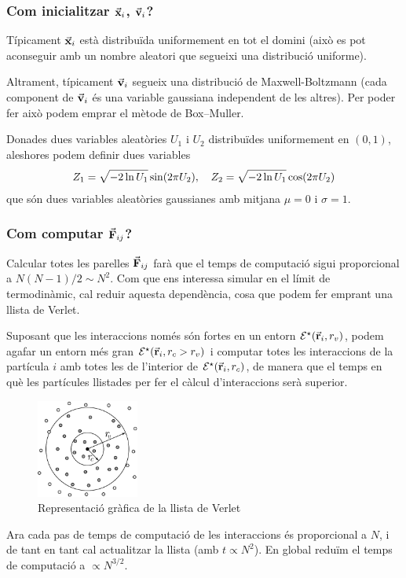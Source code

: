 \subsubsection*{Com inicialitzar $\va{x}_{i}$, $\va{v}_{i}$?}
Típicament $\va{x}_{i}$ està distribuïda uniformement en tot el domini (això es pot aconseguir amb un nombre aleatori que segueixi una distribució uniforme).

Altrament, típicament $\va{v}_{i}$ segueix una distribució de Maxwell-Boltzmann (cada component de $\va{v}_{i}$ és una variable gaussiana independent de les altres). Per poder fer això podem emprar el mètode de Box--Muller.

\begin{meth}\label{met:box-muller}
	Donades dues variables aleatòries $U_{1}$ i $U_{2}$ distribuïdes uniformement en $(0,1)$, aleshores podem definir dues variables
	\begin{align}
		Z_{1} = \sqrt{-2 \ln U_{1}} \sin (2\pi U_{2}) \qc Z_{2} = \sqrt{-2 \ln U_{1}} \cos (2\pi U_{2})
	\end{align}
	que són dues variables aleatòries gaussianes amb mitjana $\mu = 0$ i $\sigma = 1$.
\end{meth}

\subsubsection*{Com computar $\va{F}_{ij}$?}
Calcular totes les parelles $\va{F}_{ij}$ farà que el temps de computació sigui proporcional a $N (N-1)/2 \sim N^{2}$. Com que ens interessa simular en el límit de termodinàmic, cal reduir aquesta dependència, cosa que podem fer emprant una llista de Verlet.
\begin{meth}\label{meth:llista-verlet}
	Suposant que les interaccions només són fortes en un entorn $\mathcal{E}^{\star}{}(\va{r}_{i},r_{v})$, podem agafar un entorn més gran $\mathcal{E}^{\star}{}(\va{r}_{i},r_{c} > r_{v})$ i computar totes les interaccions de la partícula $i$ amb totes les de l'interior de $\mathcal{E}^{\star}{}(\va{r}_{i},r_{c})$, de manera que el temps en què les partícules llistades per fer el càlcul d'interaccions serà superior.
	\begin{figure}[H]
		\centering
		\includegraphics[width=0.3\textwidth]{./images/llista-verlet}
		\caption{Representació gràfica de la llista de Verlet}
		\label{fig:llista-verlet}
	\end{figure}

	Ara cada pas de temps de computació de les interaccions és proporcional a $N$, i de tant en tant cal actualitzar la llista (amb $t \propto N^{2}$). En global reduïm el temps de computació a $\propto N^{3/2}$.
\end{meth}

